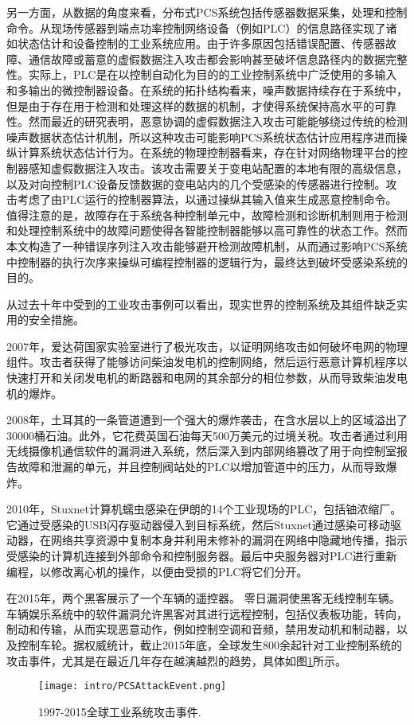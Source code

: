 另一方面，从数据的角度来看，分布式PCS系统包括传感器数据采集，处理和控制命令。从现场传感器到端点功率控制网络设备（例如PLC）的信息路径实现了诸如状态估计和设备控制的工业系统应用。由于许多原因包括错误配置、传感器故障、通信故障或蓄意的虚假数据注入攻击都会影响甚至破坏信息路径内的数据完整性。实际上，PLC是在以控制自动化为目的的工业控制系统中广泛使用的多输入和多输出的微控制器设备。在系统的拓扑结构看来，噪声数据持续存在于系统中，但是由于存在用于检测和处理这样的数据的机制，才使得系统保持高水平的可靠性。然而最近的研究\parencite{Liu11,Zonouz12}表明，恶意协调的虚假数据注入攻击可能能够绕过传统的检测噪声数据状态估计机制，所以这种攻击可能影响PCS系统状态估计应用程序进而操纵计算系统状态估计行为\parencite{Liu092,Teixeira12,Xie11}。在系统的物理控制器看来，存在针对网络物理平台的控制器感知虚假数据注入攻击。该攻击需要关于变电站配置的本地有限的高级信息，以及对向控制PLC设备反馈数据的变电站内的几个受感染的传感器进行控制。攻击考虑了由PLC运行的控制器算法，以通过操纵其输入值来生成恶意控制命令。值得注意的是，故障存在于系统各种控制单元中，故障检测和诊断机制则用于检测和处理控制系统中的故障问题使得各智能控制器能够以高可靠性的状态工作。然而本文构造了一种错误序列注入攻击能够避开检测故障机制，从而通过影响PCS系统中控制器的执行次序来操纵可编程控制器的逻辑行为，最终达到破坏受感染系统的目的。

从过去十年中受到的工业攻击事例可以看出，现实世界的控制系统及其组件缺乏实用的安全措施。

2007年，爱达荷国家实验室进行了极光攻击，以证明网络攻击如何破坏电网的物理组件\parencite{Meserve072}。攻击者获得了能够访问柴油发电机的控制网络，然后运行恶意计算机程序以快速打开和关闭发电机的断路器和电网的其余部分的相位参数，从而导致柴油发电机的爆炸。

2008年，土耳其的一条管道遭到一个强大的爆炸袭击，在含水层以上的区域溢出了30000桶石油。此外，它花费英国石油每天500万美元的过境关税。攻击者通过利用无线摄像机通信软件的漏洞进入系统，然后深入到内部网络篡改了用于向控制室报告故障和泄漏的单元，并且控制阀站处的PLC以增加管道中的压力，从而导致爆炸。

2010年，Stuxnet计算机蠕虫感染在伊朗的14个工业现场的PLC，包括铀浓缩厂\parencite{Kushner07,Chen11}。它通过受感染的USB闪存驱动器侵入到目标系统，然后Stuxnet通过感染可移动驱动器，在网络共享资源中复制本身并利用未修补的漏洞在网络中隐藏地传播，指示受感染的计算机连接到外部命令和控制服务器。最后中央服务器对PLC进行重新编程，以修改离心机的操作，以便由受损的PLC将它们分开\parencite{Line14}。

在2015年，两个黑客展示了一个车辆的遥控器\parencite{Miller15}。 零日漏洞使黑客无线控制车辆。车辆娱乐系统中的软件漏洞允许黑客对其进行远程控制，包括仪表板功能，转向，制动和传输，从而实现恶意动作，例如控制空调和音频，禁用发动机和制动器，以及控制车轮\parencite{Thomas15}。据权威统计，截止2015年底，全球发生800余起针对工业控制系统的攻击事件，尤其是在最近几年存在越演越烈的趋势，具体如图\ref{pcsattack}所示。
\begin{figure}[!htp]
 \centering
 \texttt{[image: intro/PCSAttackEvent.png]}
 \caption{1997-2015全球工业系统攻击事件.}
 \label{pcsattack}
\end{figure}


